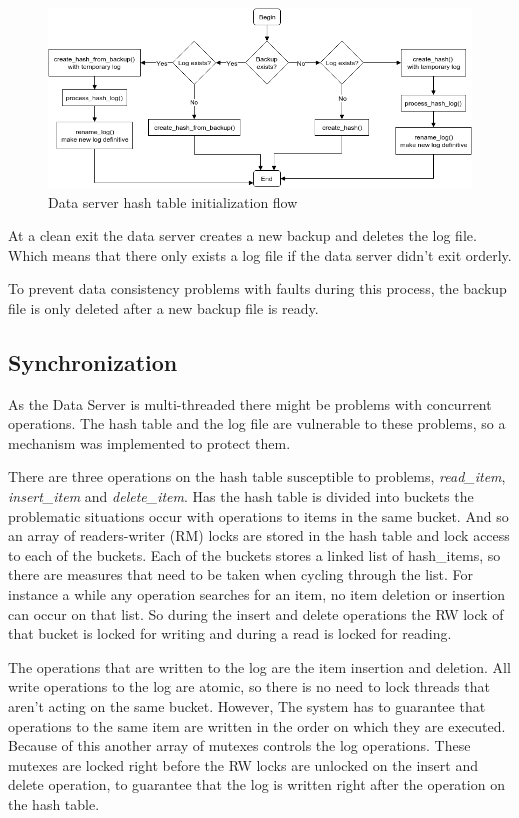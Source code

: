 \documentclass[12pt]{article} %
\begin{document}
\begin{figure}[H]
\centering
\includegraphics[width=\textwidth]{./Pictures/BackupLogFlow.png}
\caption{Data server hash table initialization flow}\label{fig:BackupLogFlow}
\end{figure}

At a clean exit the data server creates a new backup and deletes the log file.
Which means that there only exists a log file if the data server didn't exit orderly.

To prevent data consistency problems with faults during this process, the
backup file is only deleted after a new backup file is ready.

\subsection{Synchronization}
\label{sub:Synchronization}

As the Data Server is multi-threaded there might be problems with concurrent operations.
The hash table and the log file are vulnerable to these problems, so a mechanism was implemented to protect them.

There are three operations on the hash table susceptible to problems, \emph{read\_item}, \emph{insert\_item} and \emph{delete\_item}.
Has the hash table is divided into buckets the problematic situations occur with operations to items in the same bucket.
And so an array of readers-writer (RM) locks are stored in the hash table and lock access to each of the buckets.
Each of the buckets stores a linked list of hash\_items, so there are measures that need to be taken when cycling through the list.
For instance a while any operation searches for an item, no item deletion or insertion can occur on that list. So during the insert and delete operations the RW lock of that bucket is locked for writing and during a read is locked for reading.

The operations that are written to the log are the item insertion and deletion.
All write operations to the log are atomic, so there is no need to lock threads that aren't acting on the same bucket.
However, The system has to guarantee that operations to the same item are written in the order on which they are executed.
Because of this another array of mutexes controls the log operations.
These mutexes are locked right before the RW locks are unlocked on the insert and delete operation, to guarantee that the log is written right after the operation on the hash table.
\end{document}
